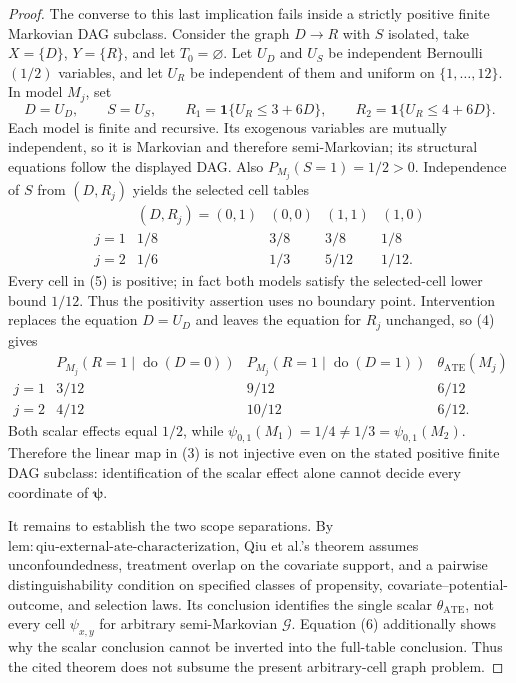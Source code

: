 \documentclass{article}
\begin{document}
\begin{proof}
The converse to this last implication fails inside a strictly positive finite Markovian DAG subclass.  Consider the graph \(D\to R\) with \(S\) isolated, take \(X=\{D\}\), \(Y=\{R\}\), and let \(T_0=\varnothing\).  Let \(U_D\) and \(U_S\) be independent Bernoulli\((1/2)\) variables, and let \(U_R\) be independent of them and uniform on \(\{1,\ldots,12\}\).  In model \(M_j\), set
\[
D=U_D,\qquad S=U_S,
\qquad
R_1=\mathbf 1\{U_R\le 3+6D\},
\qquad
R_2=\mathbf 1\{U_R\le 4+6D\}.
\tag{4}
\]
Each model is finite and recursive.  Its exogenous variables are mutually independent, so it is Markovian and therefore semi-Markovian; its structural equations follow the displayed DAG.  Also \(P_{M_j}(S=1)=1/2>0\).  Independence of \(S\) from \((D,R_j)\) yields the selected cell tables
\[
\begin{array}{c|cccc}
&(D,R_j)=(0,1)&(0,0)&(1,1)&(1,0)\\ \hline
j=1&1/8&3/8&3/8&1/8\\
j=2&1/6&1/3&5/12&1/12.
\end{array}
\tag{5}
\]
Every cell in (5) is positive; in fact both models satisfy the selected-cell lower bound \(1/12\).  Thus the positivity assertion uses no boundary point.  Intervention replaces the equation \(D=U_D\) and leaves the equation for \(R_j\) unchanged, so (4) gives
\[
\begin{array}{c|cc|c}
&P_{M_j}(R=1\mid\operatorname{do}(D=0))
&P_{M_j}(R=1\mid\operatorname{do}(D=1))
&\theta_{\mathrm{ATE}}(M_j)\\ \hline
j=1&3/12&9/12&6/12\\
j=2&4/12&10/12&6/12.
\end{array}
\tag{6}
\]
Both scalar effects equal \(1/2\), while \(\psi_{0,1}(M_1)=1/4\ne1/3=\psi_{0,1}(M_2)\).  Therefore the linear map in (3) is not injective even on the stated positive finite DAG subclass: identification of the scalar effect alone cannot decide every coordinate of \(\boldsymbol\psi\).

It remains to establish the two scope separations.  By \(\mathrm{lem:qiu\text{-}external\text{-}ate\text{-}characterization}\), Qiu et al.'s theorem assumes unconfoundedness, treatment overlap on the covariate support, and a pairwise distinguishability condition on specified classes of propensity, covariate--potential-outcome, and selection laws.  Its conclusion identifies the single scalar \(\theta_{\mathrm{ATE}}\), not every cell \(\psi_{x,y}\) for arbitrary semi-Markovian \(\mathcal G\).  Equation (6) additionally shows why the scalar conclusion cannot be inverted into the full-table conclusion.  Thus the cited theorem does not subsume the present arbitrary-cell graph problem.


\end{proof}
\end{document}
